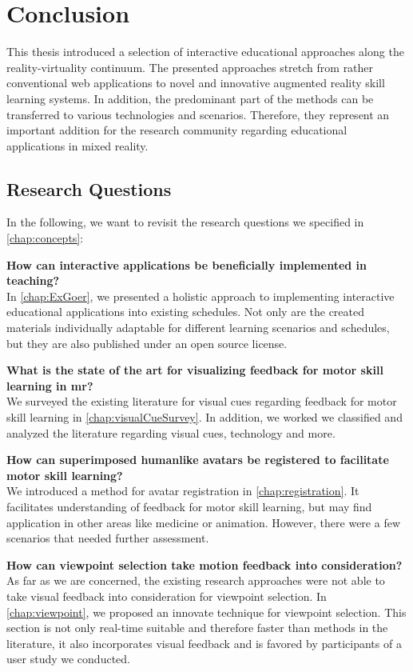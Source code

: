 %
\chapter{Conclusion}
\label{chap:conclusion}

This thesis introduced a selection of interactive educational approaches along the reality-virtuality continuum.
The presented approaches stretch from rather conventional web applications to novel and innovative augmented reality skill learning systems. In addition, the predominant part of the methods can be transferred to various technologies and scenarios. Therefore, they represent an important addition for the research community regarding educational applications in mixed reality. 

\section{Research Questions \label{sec:questions}}
In the following, we want to revisit the research questions we specified in \autoref{chap:concepts}:

\textbf{How can interactive applications be beneficially implemented in teaching?}\\
In \autoref{chap:ExGoer}, we presented a holistic approach to implementing interactive educational applications into existing schedules.
Not only are the created materials individually adaptable for different learning scenarios and schedules, but they are also published under an open source license.

\textbf{What is the state of the art for visualizing feedback for motor skill learning in \acrlong{mr}?}\\
We surveyed the existing literature for visual cues regarding feedback for motor skill learning in \autoref{chap:visualCueSurvey}. In addition, we worked we classified and analyzed the literature regarding visual cues, technology and more.

\textbf{How can superimposed humanlike avatars be registered to facilitate motor skill learning?}\\
We introduced a method for avatar registration in \autoref{chap:registration}. It facilitates understanding of feedback for motor skill learning, but may find application in other areas like medicine or animation. However, there were a few scenarios that needed further assessment.

\textbf{How can viewpoint selection take motion feedback into consideration?}\\
As far as we are concerned, the existing research approaches were not able to take visual feedback into consideration for viewpoint selection. In \autoref{chap:viewpoint}, we proposed an innovate technique for viewpoint selection. This section is not only real-time suitable and therefore faster than methods in the literature, it also incorporates visual feedback and is favored by participants of a user study we conducted.

